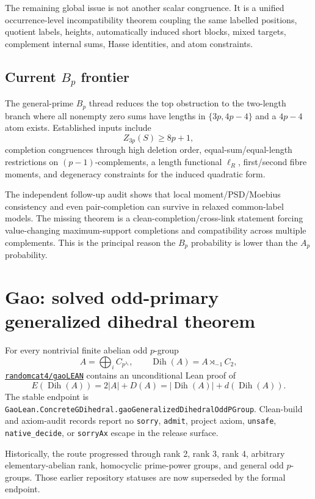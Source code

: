 \documentclass[11pt,a4paper]{ctexart}
\newcommand{\repo}[2]{\href{#2}{\texttt{#1}}}
\begin{document}
The remaining global issue is not another scalar congruence. It is a unified occurrence-level incompatibility theorem coupling the same labelled positions, quotient labels, heights, automatically induced short blocks, mixed targets, complement internal sums, Hasse identities, and atom constraints.

\subsection{Current $B_p$ frontier}

The general-prime $B_p$ thread reduces the top obstruction to the two-length branch where all nonempty zero sums have lengths in $\{3p,4p-4\}$ and a $4p-4$ atom exists. Established inputs include
\[
Z_{3p}(S)\ge8p+1,
\]
completion congruences through high deletion order, equal-sum/equal-length restrictions on $(p-1)$-complements, a length functional $\ell_R$, first/second fibre moments, and degeneracy constraints for the induced quadratic form.

The independent follow-up audit shows that local moment/PSD/Moebius consistency and even pair-completion can survive in relaxed common-label models. The missing theorem is a clean-completion/cross-link statement forcing value-changing maximum-support completions and compatibility across multiple complements. This is the principal reason the $B_p$ probability is lower than the $A_p$ probability.

\section{Gao: solved odd-primary generalized dihedral theorem}

For every nontrivial finite abelian odd $p$-group
\[
A=\bigoplus_i C_{p^{\lambda_i}},
\qquad
\operatorname{Dih}(A)=A\rtimes_{-1}C_2,
\]
\repo{randomcat4/gaoLEAN}{https://github.com/randomcat4/gaoLEAN} contains an unconditional Lean proof of
\[
E(\operatorname{Dih}(A))
=2|A|+D(A)
=|\operatorname{Dih}(A)|+d(\operatorname{Dih}(A)).
\]
The stable endpoint is \texttt{GaoLean.ConcreteGDihedral.gaoGeneralizedDihedralOddPGroup}. Clean-build and axiom-audit records report no \texttt{sorry}, \texttt{admit}, project axiom, \texttt{unsafe}, \texttt{native\_decide}, or \texttt{sorryAx} escape in the release surface.

Historically, the route progressed through rank 2, rank 3, rank 4, arbitrary elementary-abelian rank, homocyclic prime-power groups, and general odd $p$-groups. Those earlier repository statuses are now superseded by the formal endpoint.
\end{document}
